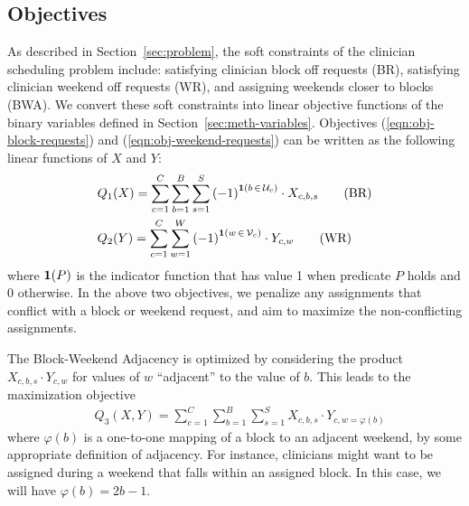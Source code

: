 \subsection{Objectives}\label{sec:meth-objectives}
As described in Section~\ref{sec:problem}, the soft constraints of the clinician
scheduling problem include: satisfying clinician block off requests (BR),
satisfying clinician weekend off requests (WR), and assigning weekends closer to
blocks (BWA). We convert these soft constraints into linear objective functions
of the binary variables defined in Section~\ref{sec:meth-variables}. Objectives
(\ref{eqn:obj-block-requests}) and (\ref{eqn:obj-weekend-requests}) can be
written as the following linear functions of $X$ and $Y$:  %
\begin{align}
&Q_1(X) = \sum_{c=1}^{C} \sum_{b=1}^{B} \sum_{s=1}^{S}
{(-1)}^{\bm{1}(b\,\in\,\mathcal{U}_c)}\cdot X_{c, b, s} \tag{BR}
\label{eqn:obj-block-requests}\\
&Q_2(Y) = \sum_{c=1}^{C} \sum_{w=1}^{W}
{(-1)}^{\bm{1}(w\,\in\,\mathcal{V}_c)}\cdot Y_{c, w} \tag{WR}
\label{eqn:obj-weekend-requests}
\end{align}
where $\bm{1}(P)$ is the indicator function that has value 1 when predicate $P$
holds and 0 otherwise. In the above two objectives, we penalize any assignments
that conflict with a block or weekend request, and aim to maximize the
non-conflicting assignments.

The Block-Weekend Adjacency is optimized by considering the product $X_{c, b,
	s}\cdot Y_{c, w}$ for values of $w$ ``adjacent'' to the value of $b$. This
leads
to the maximization objective %
\begin{align}
&Q_3(X, Y) = \sum_{c=1}^{C} \sum_{b=1}^{B} \sum_{s=1}^{S} X_{c, b, s}\cdot Y_{c,
	w=\varphi(b)} \tag{BWA} \label{eqn:obj-block-weekend-adj}
\end{align}
where $\varphi(b)$ is a one-to-one mapping of a block to an adjacent weekend, by
some appropriate definition of adjacency. For instance, clinicians might want to
be assigned during a weekend that falls within an assigned block. In this case,
we will have $\varphi(b) = 2b-1$.


